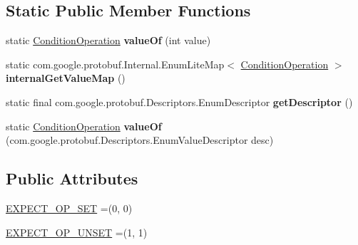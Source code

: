\subsection*{Static Public Member Functions}
\begin{DoxyCompactItemize}
\item 
\mbox{\label{enumcom_1_1mysql_1_1cj_1_1x_1_1protobuf_1_1_mysqlx_expect_1_1_open_1_1_condition_1_1_condition_operation_aaaf9d5b6cf79ef769a3183d63b7c4559}} 
static \mbox{\hyperlink{enumcom_1_1mysql_1_1cj_1_1x_1_1protobuf_1_1_mysqlx_expect_1_1_open_1_1_condition_1_1_condition_operation}{Condition\+Operation}} {\bfseries value\+Of} (int value)
\item 
\mbox{\label{enumcom_1_1mysql_1_1cj_1_1x_1_1protobuf_1_1_mysqlx_expect_1_1_open_1_1_condition_1_1_condition_operation_a7b769f57d35e05ea1063ed5c55a70b89}} 
static com.\+google.\+protobuf.\+Internal.\+Enum\+Lite\+Map$<$ \mbox{\hyperlink{enumcom_1_1mysql_1_1cj_1_1x_1_1protobuf_1_1_mysqlx_expect_1_1_open_1_1_condition_1_1_condition_operation}{Condition\+Operation}} $>$ {\bfseries internal\+Get\+Value\+Map} ()
\item 
\mbox{\label{enumcom_1_1mysql_1_1cj_1_1x_1_1protobuf_1_1_mysqlx_expect_1_1_open_1_1_condition_1_1_condition_operation_a1834e7f55e6abe6cb246df1ead9631a5}} 
static final com.\+google.\+protobuf.\+Descriptors.\+Enum\+Descriptor {\bfseries get\+Descriptor} ()
\item 
\mbox{\label{enumcom_1_1mysql_1_1cj_1_1x_1_1protobuf_1_1_mysqlx_expect_1_1_open_1_1_condition_1_1_condition_operation_a5b1c8b1e481a241ad14579c751c7a418}} 
static \mbox{\hyperlink{enumcom_1_1mysql_1_1cj_1_1x_1_1protobuf_1_1_mysqlx_expect_1_1_open_1_1_condition_1_1_condition_operation}{Condition\+Operation}} {\bfseries value\+Of} (com.\+google.\+protobuf.\+Descriptors.\+Enum\+Value\+Descriptor desc)
\end{DoxyCompactItemize}
\subsection*{Public Attributes}
\begin{DoxyCompactItemize}
\item 
\mbox{\hyperlink{enumcom_1_1mysql_1_1cj_1_1x_1_1protobuf_1_1_mysqlx_expect_1_1_open_1_1_condition_1_1_condition_operation_af7ff7aeb56ef9c3b991dffe432c2b75c}{E\+X\+P\+E\+C\+T\+\_\+\+O\+P\+\_\+\+S\+ET}} =(0, 0)
\item 
\mbox{\hyperlink{enumcom_1_1mysql_1_1cj_1_1x_1_1protobuf_1_1_mysqlx_expect_1_1_open_1_1_condition_1_1_condition_operation_ad2cc943e3997ea5c5b8f8e900081dfec}{E\+X\+P\+E\+C\+T\+\_\+\+O\+P\+\_\+\+U\+N\+S\+ET}} =(1, 1)
\end{DoxyCompactItemize}
